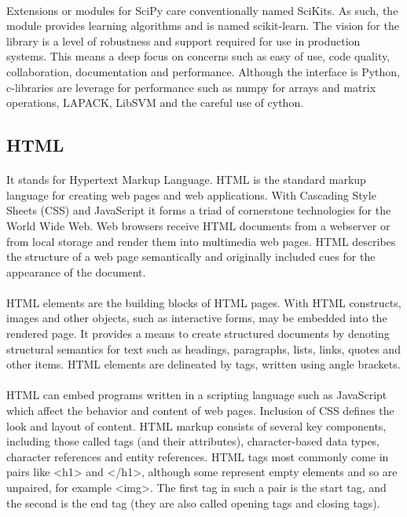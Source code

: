 \paragraph{}
Extensions or modules for SciPy care conventionally named SciKits. As such, the module provides learning algorithms and is named scikit-learn. The vision for the library is a level of robustness and support required for use in production systems. This means a deep focus on concerns such as easy of use, code quality, collaboration, documentation and performance. Although the interface is Python, c-libraries are leverage for performance such as numpy for arrays and matrix operations, LAPACK, LibSVM and the careful use of cython.

\subsection{HTML}
\paragraph{}
It stands for Hypertext Markup Language. HTML is the standard markup language for creating web pages and web applications. With Cascading Style Sheets (CSS) and JavaScript it forms a triad of cornerstone technologies for the World Wide Web. Web browsers receive HTML documents from a webserver or from local storage and render them into multimedia web pages. HTML describes the structure of a web page semantically and originally included cues for the appearance of the document.
\paragraph{}
HTML elements are the building blocks of HTML pages. With HTML constructs, images and other objects, such as interactive forms, may be embedded into the rendered page. It provides a means to create structured documents by denoting structural semantics for text such as headings, paragraphs, lists, links, quotes and other items. HTML elements are delineated by tags, written using angle brackets.
\paragraph{}
HTML can embed programs written in a scripting language such as JavaScript which affect the behavior and content of web pages. Inclusion of CSS defines the look and layout of content. HTML markup consists of several key components, including those called tags (and their attributes), character-based data types, character references and entity references. HTML tags most commonly come in pairs like <h1> and </h1>, although some represent empty elements and so are unpaired, for example <img>. The first tag in such a pair is the start tag, and the second is the end tag (they are also called opening tags and closing tags).
